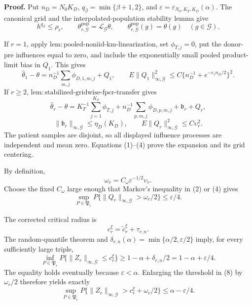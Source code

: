 \textbf{Proof.}
Put \(n_D=N_0K_D\), \(q_\beta=\min\{\beta+1,2\}\), and
\(\varepsilon=\varepsilon_{N_0,K_T,K_D}(\alpha)\).  The canonical grid and
the interpolated-population stability lemma give
\[
 h^{q_\beta}\le\rho_r,
 \qquad
 \theta^{\mathrm{pop}}_{r,\mathcal G}=\mathcal L_{\mathcal G}\theta,
 \qquad
 \theta^{\mathrm{pop}}_{r,\mathcal G}(g)=\theta(g)
 \quad(g\in\mathcal G).                                    \tag{1}
\]

If \(r=1\), apply
\(\mathrm{lem:pooled\mbox{-}noniid\mbox{-}km\mbox{-}linearization}\), set
\(\phi_{T,j}=0\), put the donor-pre influences equal to zero, and include
the exponentially small pooled product-limit bias in \(Q_1\).  This gives
\[
 \widehat\theta_1-\theta
 =n_D^{-1}\sum_{m,j}\phi_{D,1,m,j}+Q_1,
 \qquad
 E\|Q_1\|_{\infty,\mathcal G}^2
 \le C\{n_D^{-1}+e^{-c_\dagger n_D/2}\}^2.                \tag{2}
\]
If \(r\ge2\),
\(\mathrm{lem:stabilized\mbox{-}gridwise\mbox{-}fpcr\mbox{-}transfer}\)
gives
\[
 \widehat\theta_r-\theta
 =K_T^{-1}\sum_{j=1}^{K_T}\phi_{T,j}
 +n_D^{-1}\sum_{p,m,j}\phi_{D,p,m,j}
 +\mathfrak b_r+Q_r,                                       \tag{3}
\]
\[
 \|\mathfrak b_r\|_{\infty,\mathcal G}\le\eta_D(K_D),
 \qquad E\|Q_r\|_{\infty,\mathcal G}^2\le C\upsilon_r^2. \tag{4}
\]
The patient samples are disjoint, so all displayed influence processes are
independent and mean zero.  Equations (1)--(4) prove the expansion and its
grid centering.

By definition,
\[
 \omega_r=C_\omega\varepsilon^{-1/2}\upsilon_r.            \tag{5}
\]
Choose the fixed \(C_\omega\) large enough that Markov's inequality in
(2) or (4) gives
\[
 \sup_{P\in\mathfrak P_r}
 P\{\|Q_r\|_{\infty,\mathcal G}>\omega_r/2\}
 \le\varepsilon/4.                                         \tag{6}
\]

The corrected critical radius is
\[
 c_r^\xi=\widetilde c_r^\xi+\tau_{r,n}.                    \tag{7}
\]
The random-quantile theorem and
\(\delta_{r,n}(\alpha)=\min\{\alpha/2,\varepsilon/2\}\)
imply, for every sufficiently large triple,
\[
 \inf_{P\in\mathfrak P_r}
 P\{\|Z_r\|_{\infty,\mathcal G}\le c_r^\xi\}
 \ge1-\alpha+\delta_{r,n}/2
 =1-\alpha+\varepsilon/4.                                 \tag{8}
\]
The equality holds eventually because \(\varepsilon<\alpha\).  Enlarging
the threshold in (8) by \(\omega_r/2\) therefore yields exactly
\[
 \sup_{P\in\mathfrak P_r}
 P\{\|Z_r\|_{\infty,\mathcal G}>c_r^\xi+\omega_r/2\}
 \le\alpha-\varepsilon/4.                                 \tag{9}
\]

